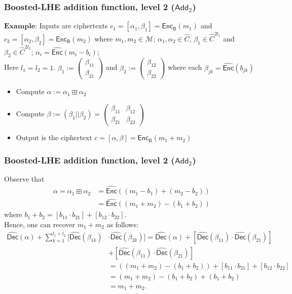 \documentclass{beamer}
\begin{document}
\begin{frame}[t]
\frametitle{Boosted-LHE addition function, level 2 ($\mathsf{Add_2}$)}
$\textbf{Example:}$ Inputs are ciphertexts $c_1=[\alpha_1,\beta_1]=\mathsf{Enc_B}(m_1)$ and $c_2=[\alpha_2,\beta_2]=\mathsf{Enc_B}(m_2)$ where $m_1,m_2 \in \mathcal{M}$; $\alpha_1, \alpha_2 \in \widehat{C},\, \beta_1 \in {\widehat{C}}^{2l_1}$ and $\beta_2 \in {\widehat{C}}^{2l_2}$; $\alpha_i=\widehat{\mathsf{Enc}}(m_i-b_i)$; \\
\vspace*{1mm}
Here $l_1=l_2=1$. $\beta_1 := \left(\begin{array}{c} \beta_{11} \\ \beta_{21} \end{array} \right)$ and $\beta_2 := \left(\begin{array}{c} \beta_{12} \\ \beta_{22} \end{array} \right)$ where each $\beta_{jk}=\widehat{\mathsf{Enc}}(b_{jk})$
\begin{itemize}
\item Compute  $\alpha := \alpha_1 \boxplus \alpha_2 $ 
\item Compute  $\beta :=(\beta_1 || \beta_2)= \left(\begin{array}{cc} \beta_{11} & \beta_{12} \\ \beta_{21} & \beta_{22} \end{array} \right)$
\item Output is the ciphertext $c=[\alpha,\beta]= \mathsf{Enc_B}(m_1+m_2)$
\end{itemize}
\end{frame}

\begin{frame}[t]
\frametitle{Boosted-LHE addition function, level 2 ($\mathsf{Add_2}$)}
Observe that
\begin{align*}
\alpha = \alpha_1 \boxplus \alpha_2 &={\widehat{\mathsf{Enc}}}((m_1-b_1)+(m_2-b_2)) \\
&= {\widehat{\mathsf{Enc}}}((m_1+m_2)-(b_1+b_2))
\end{align*}
where $b_1+b_2=[{b_{11}}\cdot{b_{21}}]+[{b_{12}}\cdot {b_{22}}]$.\\
\vspace*{2mm}
Hence, one can recover $m_1+m_2$ as follows:
\begin{align*}
\widehat{\mathsf{Dec}}(\alpha)+ \sum_{k=1}^{l_1+l_2}[\widehat{\mathsf{Dec}}(\beta_{1k})&  \cdot \widehat{\mathsf{Dec}}(\beta_{2k})]= \widehat{\mathsf{Dec}}(\alpha)+[\widehat{\mathsf{Dec}}(\beta_{11})\cdot \widehat{\mathsf{Dec}}(\beta_{21})]\\&+[\widehat{\mathsf{Dec}}(\beta_{11})\cdot \widehat{\mathsf{Dec}}(\beta_{21})]\\&=((m_1+m_2)-(b_1+b_2))+[{b_{11}}\cdot{b_{21}}]+[{b_{12}}\cdot {b_{22}}]\\&=(m_1+m_2)-(b_1+b_2)+(b_1+b_2)\\&=m_1+m_2.
\end{align*}
\end{frame}
\end{document}
